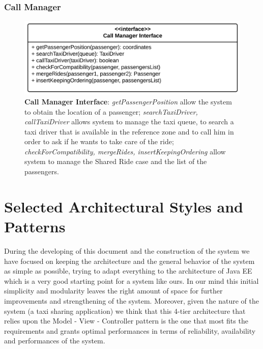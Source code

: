 \subsubsection{Call Manager}
\begin{figure}[htbp]
\centering
\includegraphics[width=\textwidth]{cpt/img/ComponentInterfacesCallManagerInterface}
\caption{\textbf{Call Manager Interface}: \textit{getPassengerPosition} allow the system to obtain the location of a passenger; \textit{searchTaxiDriver, callTaxiDriver} allows system to manage the taxi queue, to search a taxi driver that is available in the reference zone and to call him in order to ask if he wants to take care of the ride; \textit{checkForCompatibility, mergeRides, insertKeepingOrdering} allow system to manage the Shared Ride case and the list of the passengers.
}
\end{figure}
\clearpage

\section{Selected Architectural Styles and Patterns}
During the developing of this document and the construction of the system we have focused on keeping the architecture and the general behavior of the system as simple as possible, trying to adapt everything to the architecture of Java EE which is a very good starting point for a system like ours. In our mind this initial simplicity and modularity leaves the right amount of space for further improvements and strengthening of the system. Moreover, given the nature of the system (a taxi sharing application) we think that this 4-tier architecture that relies upon the Model - View - Controller pattern is the one that most fits the requirements and grants optimal performances in terms of reliability, availability and performances of the system.